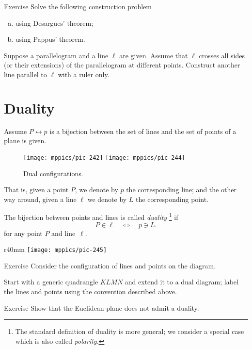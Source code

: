 \begin{thm}{Exercise}\label{ex:desargues-construction}
Solve the following construction problem
\begin{enumerate}[(a)]
\item\label{ex:desargues-construction:desargues} using Desargues' theorem;
\item\label{ex:desargues-construction:pappus} using Pappus' theorem.
\end{enumerate}
Suppose a parallelogram and a line $\ell$ are given.
Assume that $\ell$ crosses all sides (or their extensions) of the parallelogram at different points. 
Construct another line parallel to $\ell$ with a ruler only.
\end{thm}


\section{Duality}

Assume $P\leftrightarrow p$ is a bijection between the set of lines and the set of points of a plane is given.
\begin{figure}[!ht]
\centering
\texttt{[image: mppics/pic-242]}
\hskip15mm
\texttt{[image: mppics/pic-244]}
\caption*{Dual configurations.}
\end{figure}
That is,
given a point $P$, we denote by $p$ the corresponding line;
and the other way around, 
given a line $\ell$ we denote by $L$ the corresponding point. 

The bijection between points and lines is called \emph{duality}\label{page:duality}%
\footnote{The standard definition of duality is more general; we consider a special case which is also called \emph{polarity}.}
if 
\[P\in \ell
\quad
\iff
\quad 
p\ni L.\]
for any point $P$ and line~$\ell$.

{

\begin{wrapfigure}{r}{40mm}
\vskip-8mm
\centering
\texttt{[image: mppics/pic-245]}
\end{wrapfigure}

\begin{thm}{Exercise}\label{ex:dual-configurations}
Consider the configuration of lines and points on the diagram.

Start with a generic quadrangle $KLMN$ and extend it to a dual diagram; label the lines and points using the convention described above.
\end{thm}

\begin{thm}{Exercise}\label{ex:dual-euclid}
Show that the Euclidean plane does not admit a duality. 
\end{thm}

}

